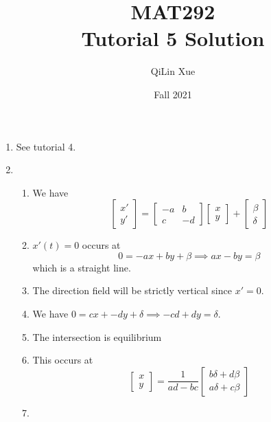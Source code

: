 \documentclass{article}
\title{MAT292 \\ Tutorial 5 Solution}
\author{QiLin Xue}
\date{Fall 2021}
\begin{document}
\newcommand{\tabitem}{~~\llap{\textbullet}~~}

\maketitle
\begin{enumerate}
    \item See tutorial 4.
    \item \begin{enumerate}
        \item We have 
        $$\begin{bmatrix}
            x' \\ y'
        \end{bmatrix} = \begin{bmatrix}
        -a & b \\ 
        c & -d   
        \end{bmatrix}\begin{bmatrix}
            x\\ y
        \end{bmatrix} + \begin{bmatrix}
            \beta \\ \delta
        \end{bmatrix}$$
        \item $x'(t)=0$ occurs at 
        $$0=-ax+by+\beta \implies ax-by=\beta$$
        which is a straight line.
        \item The direction field will be strictly vertical since $x'=0$.
        \item We have $0=cx+-dy+\delta \implies -cd+dy = \delta$.
        \item The intersection is equilibrium
        \item This occurs at 
        $$\begin{bmatrix}
            x \\ y
        \end{bmatrix} = \frac{1}{ad-bc}\begin{bmatrix}
            b\delta + d\beta \\ 
            a\delta + c\beta
        \end{bmatrix}$$
        \item 
    \end{enumerate}
\end{enumerate}
\end{document}
